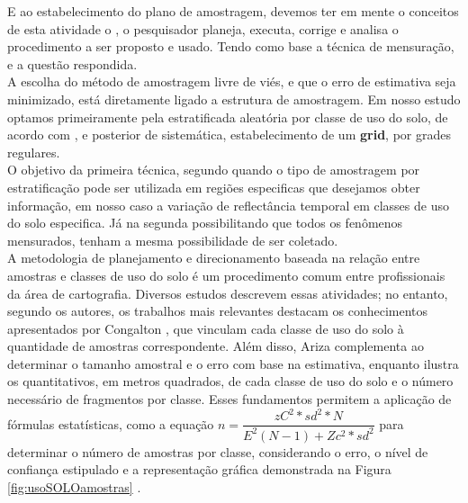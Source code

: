   \hspace*{1.25 cm} E ao estabelecimento do plano de amostragem, devemos ter em mente o conceitos de esta atividade o  \cite[p.2]{Bolfarine1},  o pesquisador planeja, executa, corrige e analisa o procedimento a ser proposto e usado. Tendo como base a técnica de mensuração, e a questão respondida.\\
% 
  \hspace*{1.25 cm} A escolha do método de amostragem livre de viés, e que o erro de estimativa seja minimizado, está diretamente ligado a estrutura de amostragem.  Em nosso estudo optamos primeiramente pela estratificada aleatória por classe de uso do solo, de acordo com \cite[p.191]{Ariza}, e  posterior  de  sistemática, estabelecimento de um \textbf{grid}, por grades regulares.\\
  \hspace*{1.25 cm}  O objetivo da primeira técnica, segundo  \cite[p.22]{Lohr} quando o tipo de amostragem por estratificação pode ser utilizada em regiões especificas que desejamos obter informação, em nosso caso a variação de reflectância temporal em classes de uso do solo especifica. Já na segunda  possibilitando que todos os fenômenos mensurados, tenham a mesma possibilidade de ser coletado.\\
 \hspace*{1.25 cm} A metodologia de planejamento e direcionamento baseada na relação entre amostras e classes de uso do solo é um procedimento comum entre profissionais da área de cartografia. Diversos estudos descrevem essas atividades; no entanto, segundo os autores, os trabalhos mais relevantes destacam os conhecimentos apresentados por Congalton \cite[p.79]{Congalton}, que vinculam cada classe de uso do solo à quantidade de amostras correspondente. Além disso, Ariza \cite[p.135]{Ariza} complementa ao determinar o tamanho amostral e o erro com base na estimativa, enquanto \cite[p.192-196]{Ariza} ilustra os quantitativos, em metros quadrados, de cada classe de uso do solo e o número necessário de fragmentos por classe. Esses fundamentos permitem a aplicação de fórmulas estatísticas, como a equação \( n= \dfrac{zC ^{2} * sd^{2}* N}{ E^{2}(N-1) + Zc^{2}*sd^{2}} \) para determinar o número de amostras por classe, considerando o erro, o nível de confiança estipulado e a representação gráfica demonstrada na Figura \ref{fig:usoSOLOamostras}  .\\
    

